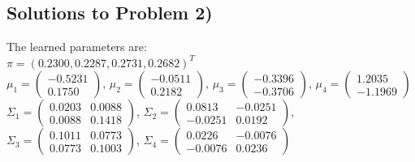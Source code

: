 \documentclass{article}
\begin{document}
\begin{spacing}{1.5}
\subsection{Solutions to Problem 2)}
The learned parameters are:\\
$\pi = (0.2300,0.2287,0.2731,0.2682)^T$ \\
$\mu_1=  \left(
  \begin{array}{c}
          -0.5231 \\
          0.1750
 \end{array}
 \right)$,
$\mu_2=  \left(
  \begin{array}{c}
         -0.0511 \\
          0.2182
 \end{array}
 \right)$, 
$\mu_3=  \left(
  \begin{array}{c}
          -0.3396 \\
          -0.3706
 \end{array}
 \right)$,
$\mu_4=  \left(
  \begin{array}{c}
          1.2035 \\
          -1.1969
 \end{array}
 \right)$ \\
$\Sigma_1= \left(
  \begin{array}{cc}
          0.0203 & 0.0088\\
          0.0088 & 0.1418
  \end{array}
  \right)$,
$\Sigma_2= \left(
  \begin{array}{cc}
          0.0813 & -0.0251\\
          -0.0251 & 0.0192
  \end{array}
  \right)$,\\
$\Sigma_3= \left(
  \begin{array}{cc}
          0.1011 & 0.0773\\
          0.0773 & 0.1003
  \end{array}
  \right)$,
$\Sigma_4= \left(
  \begin{array}{cc}
          0.0226 & -0.0076\\
          -0.0076 & 0.0236
  \end{array}
  \right)$


\end{spacing}
\end{document}
